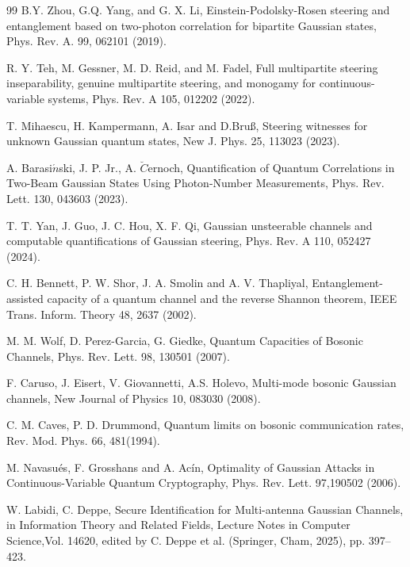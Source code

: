 \documentclass[10pt,aps,pra,amsfonts,amssymb,amsmath,%
floatfix,nofootinbib, groupedaddress,superscriptaddress,citesort,twocolumn
]{revtex4}%
\begin{document}
\begin{thebibliography}{99}
  B.Y. Zhou, G.Q. Yang, and G. X. Li,
\newblock Einstein-Podolsky-Rosen steering and entanglement based on two-photon correlation for bipartite Gaussian states,
\newblock Phys. Rev. A. 99, 062101 (2019).



  R. Y. Teh, M. Gessner, M. D.  Reid, and M. Fadel,
\newblock Full multipartite steering inseparability, genuine multipartite steering, and monogamy for continuous-variable systems,
\newblock Phys. Rev. A 105, 012202 (2022).

 T. Mihaescu, H. Kampermann, A. Isar and D.Bruß,
\newblock Steering witnesses for unknown Gaussian quantum states,
\newblock New J. Phys. 25,  113023 (2023).

 A. Barasi$\acute{n}$ski, J. P. Jr.,  A. $\breve{C}$ernoch,
\newblock Quantification of Quantum Correlations in Two-Beam Gaussian States Using Photon-Number Measurements,
\newblock Phys. Rev. Lett. 130, 043603 (2023).

 T. T. Yan, J. Guo, J. C. Hou, X. F. Qi,
\newblock Gaussian unsteerable channels and computable quantifications of Gaussian steering,
\newblock Phys. Rev. A 110, 052427 (2024).



  C. H. Bennett,  P. W. Shor, J. A. Smolin and  A. V. Thapliyal,
\newblock Entanglement-assisted capacity of a quantum channel and the reverse Shannon theorem, \newblock IEEE Trans. Inform. Theory 48, 2637 (2002).

  M. M. Wolf,  D. Perez-Garcia, G. Giedke,
\newblock Quantum Capacities of Bosonic Channels,
\newblock Phys. Rev. Lett. 98, 130501 (2007).




 F. Caruso,  J. Eisert,
V. Giovannetti, A.S. Holevo,
\newblock Multi-mode bosonic Gaussian channels,
\newblock New Journal of Physics 10, 083030 (2008).



 C. M. Caves,  P. D. Drummond,
\newblock Quantum limits on bosonic communication rates,
\newblock Rev. Mod. Phys. 66, 481(1994).

   M. Navasués,  F. Grosshans and A. Acín,
\newblock Optimality of Gaussian Attacks in Continuous-Variable Quantum Cryptography,
\newblock Phys. Rev. Lett. 97,190502 (2006).

 W. Labidi, C. Deppe,
\newblock Secure Identification for Multi-antenna Gaussian Channels,
\newblock in Information Theory and
Related Fields, Lecture Notes in Computer Science,Vol. 14620, edited by C. Deppe et al. (Springer, Cham, 2025),
pp. 397–423.




\end{thebibliography}
\end{document}
